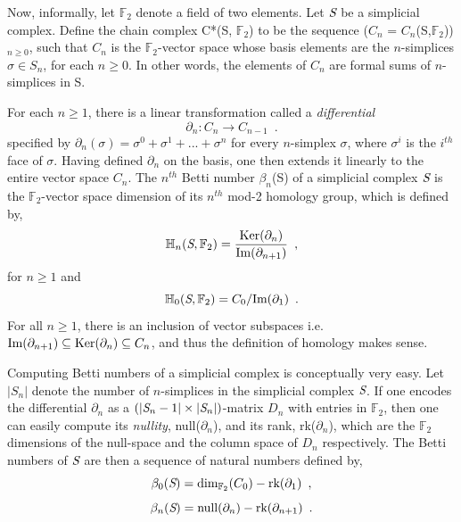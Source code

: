 Now, informally, let $\mathbb{F}_2$ denote a field of two elements. Let $\emph{S}$ be a simplicial complex. Define the chain complex C*(S, $\mathbb{F}_2$) to be the sequence ($C_n$ = $C_n$(S,$\mathbb{F}_2$))$_{n\geq0}$, such that $C_n$ is the $\mathbb{F}_2$-vector space whose basis elements are the $n$-simplices $\sigma \in  S_n$, for each $n\geq0$. In other words, the elements of $C_n$ are formal sums of $n$-simplices in S.

For each $n\geq1$, there is a linear transformation called a \textit{differential}
\begin{equation}
    \partial_n : C_n \rightarrow C_{n-1} \enspace{.}
\end{equation}
specified by $\partial_n(\sigma) = \sigma^0 + \sigma^1 + ... + \sigma^n$ for every $n$-simplex $\sigma$, where $\sigma^i$ is the $i^{th}$ face of $\sigma$. Having defined $\partial_n$ on the basis, one then extends it linearly to the entire vector space $C_n$. The $n^{th}$ Betti number $\beta_n$(S) of a simplicial complex $\emph{S}$ is the $\mathbb{F}_2$-vector space dimension of its $n^{th}$ mod-2 homology group, which is defined by,
\begin{equation}
    \mathbb{H}_n(\emph{S}, \mathbb{F}_2) = \frac{\text{Ker}(\partial_n)}{ \text{Im}(\partial_{n+1})} \enspace{,}
\end{equation}
for  $n\geq 1$ and
\begin{equation}
    \mathbb{H}_0(\emph{S}, \mathbb{F}_2) = C_0/\text{Im}(\partial_{1}) \enspace{.}
\end{equation}
For all $n\geq1$, there is an inclusion of vector subspaces i.e.~$\text{Im}(\partial_{n+1}) \subseteq \text{Ker}(\partial_{n}) \subseteq C_n$, and thus the definition of homology makes sense.

Computing Betti numbers of a simplicial complex is conceptually very easy. Let $|S_n|$ denote the number of $n$-simplices in the simplicial complex $\emph{S}$. If one encodes the differential $\partial_{n}$ as a $(|\emph{S}_n-1| \times |\emph{S}_n|)$-matrix $D_n$ with entries in $\mathbb{F}_2$, then one can easily compute its \textit{nullity}, null($\partial_n$), and its rank, rk($\partial_n$), which are the $\mathbb{F}_2$ dimensions of the null-space and the column space of $D_n$ respectively. The Betti numbers of $\emph{S}$ are then a sequence of natural numbers defined by,
\begin{equation}
    \beta_0(\emph{S}) = \text{dim}_{\mathbb{F}_2}(C_0) - \text{rk}(\partial_1) \enspace{,}
\end{equation}
\begin{equation}
    \beta_{n}(\emph{S}) = \text{null}(\partial_{n}) - \text{rk}(\partial_{n+1}) \enspace{.}
\end{equation}

